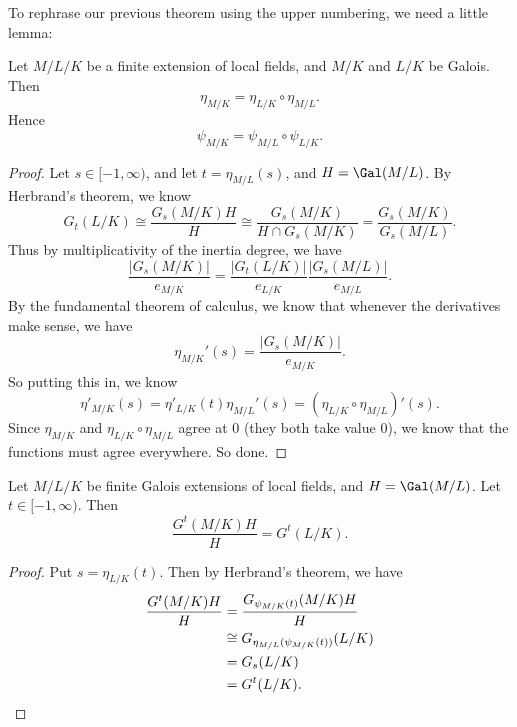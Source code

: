 \documentclass[a4paper]{article}
\begin{document}
To rephrase our previous theorem using the upper numbering, we need a little lemma:
\begin{lemma}
  Let $M/L/K$ be a finite extension of local fields, and $M/K$ and $L/K$ be Galois. Then
  \[
    \eta_{M/K} = \eta_{L/K} \circ \eta_{M/L}.
  \]
  Hence
  \[
    \psi_{M/K} = \psi_{M/L} \circ \psi_{L/K}.
  \]
\end{lemma}

\begin{proof}
  Let $s \in [-1 , \infty)$, and let $t = \eta_{M/L}(s)$, and $H = \Gal(M/L)$. By Herbrand's theorem, we know
  \[
    G_t(L/K) \cong \frac{G_s(M/K)H}{H} \cong \frac{G_s(M/K)}{H\cap G_s(M/K)} = \frac{G_s(M/K)}{G_s(M/L)}.
  \]
  Thus by multiplicativity of the inertia degree, we have
  \[
    \frac{|G_s(M/K)|}{e_{M/K}} = \frac{|G_t(L/K)|}{e_{L/K}} \frac{|G_s(M/L)|}{e_{M/L}}.
  \]
  By the fundamental theorem of calculus, we know that whenever the derivatives make sense, we have
  \[
    \eta_{M/K}'(s) = \frac{|G_s(M/K)|}{e_{M/K}}.
  \]
  So putting this in, we know
  \[
    \eta'_{M/K}(s) = \eta'_{L/K}(t) \eta_{M/L}'(s) = (\eta_{L/K} \circ \eta_{M/L})'(s).
  \]
  Since $\eta_{M/K}$ and $\eta_{L/K} \circ \eta_{M/L}$ agree at $0$ (they both take value $0$), we know that the functions must agree everywhere. So done.
\end{proof}

\begin{cor}
  Let $M/L/K$ be finite Galois extensions of local fields, and $H = \Gal(M/L)$. Let $t \in [-1, \infty)$. Then
  \[
    \frac{G^t(M/K)H}{H} = G^t(L/K).
  \]
\end{cor}

\begin{proof}
  Put $s = \eta_{L/K}(t)$. Then by Herbrand's theorem, we have
  \begin{align*}
    \frac{G^t(M/K)H}{H} &= \frac{G_{\psi_{M/K}(t)}(M/K) H}{H} \\
    &\cong G_{\eta_{M/L}(\psi_{M/K}(t))}(L/K)\\
    &= G_s(L/K)\\
    &= G^t(L/K).\qedhere
  \end{align*}
\end{proof}
\end{document}
